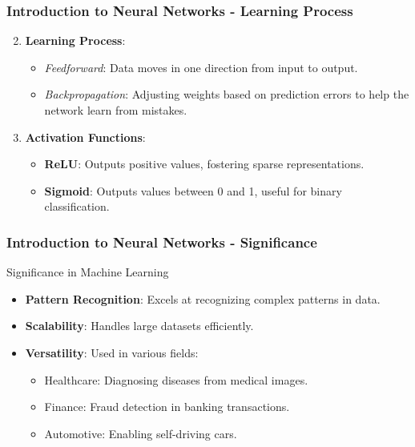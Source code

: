 \documentclass[aspectratio=169]{beamer}
\begin{document}
\begin{frame}[fragile]
    \frametitle{Introduction to Neural Networks - Learning Process}
    \begin{enumerate}
        \setcounter{enumi}{1} %
        \item \textbf{Learning Process}:
        \begin{itemize}
            \item \textit{Feedforward}: Data moves in one direction from input to output.
            \item \textit{Backpropagation}: Adjusting weights based on prediction errors to help the network learn from mistakes.
        \end{itemize}
        \item \textbf{Activation Functions}:
        \begin{itemize}
            \item \textbf{ReLU}: Outputs positive values, fostering sparse representations.
            \item \textbf{Sigmoid}: Outputs values between 0 and 1, useful for binary classification.
        \end{itemize}
    \end{enumerate}
\end{frame}

\begin{frame}[fragile]
    \frametitle{Introduction to Neural Networks - Significance}
    \begin{block}{Significance in Machine Learning}
        \begin{itemize}
            \item \textbf{Pattern Recognition}: Excels at recognizing complex patterns in data.
            \item \textbf{Scalability}: Handles large datasets efficiently.
            \item \textbf{Versatility}: Used in various fields:
            \begin{itemize}
                \item Healthcare: Diagnosing diseases from medical images.
                \item Finance: Fraud detection in banking transactions.
                \item Automotive: Enabling self-driving cars.
            \end{itemize}
        \end{itemize}
    \end{block}
\end{frame}
\end{document}

